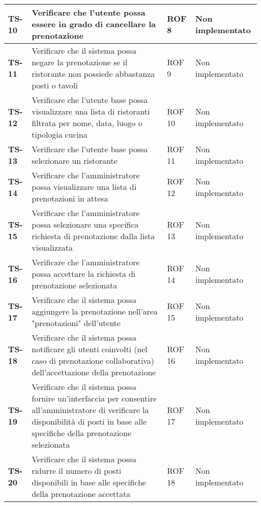 \begin{longtable}{|>{\centering\arraybackslash}p{1.5cm}|p{9.8cm}|p{2cm}|p{3.5cm}|}
    \hline
    \rowcolor{gray!10}
    \textbf{TS-10} & Verificare che l'utente possa essere in grado di cancellare la prenotazione & ROF 8 & Non implementato \\ 
    \hline
    \rowcolor{gray!10}
    \textbf{TS-11} & Verificare che il sistema possa negare la prenotazione se il ristorante non possiede abbastanza posti o tavoli & ROF 9 & Non implementato \\ 
    \hline
    \rowcolor{gray!10}
    \textbf{TS-12} & Verificare che l'utente base possa visualizzare una lista di ristoranti filtrata per nome, data, luogo o tipologia cucina & ROF 10 & Non implementato \\ 
    \hline
    \rowcolor{gray!10}
    \textbf{TS-13} & Verificare che l'utente base possa selezionare un ristorante & ROF 11 & Non implementato \\ 
    \hline
    \rowcolor{gray!10}
    \textbf{TS-14} & Verificare che l'amministratore possa visualizzare una lista di prenotazioni in attesa & ROF 12 & Non implementato \\
    \hline
    \rowcolor{gray!10}
    \textbf{TS-15} & Verificare che l'amministratore possa selezionare una specifica richiesta di prenotazione dalla lista visualizzata & ROF 13 & Non implementato \\ 
    \hline
    \rowcolor{gray!10}
    \textbf{TS-16} & Verificare che l'amministratore possa accettare la richiesta di prenotazione selezionata & ROF 14 & Non implementato \\ 
    \hline
    \rowcolor{gray!10}
    \textbf{TS-17} & Verificare che il sistema possa aggiungere la prenotazione nell'area "prenotazioni" dell'utente & ROF 15 & Non implementato \\
    \hline
    \rowcolor{gray!10}
    \textbf{TS-18} & Verificare che il sistema possa notificare gli utenti coinvolti (nel caso di prenotazione collaborativa) dell'accettazione della prenotazione & ROF 16 & Non implementato \\ 
    \hline
    \rowcolor{gray!10}
    \textbf{TS-19} & Verificare che il sistema possa fornire un'interfaccia per consentire all'amministratore di verificare la disponibilità di posti in base alle specifiche della prenotazione selezionata & ROF 17 & Non implementato \\ 
    \hline
    \rowcolor{gray!10}
    \textbf{TS-20} & Verificare che il sistema possa ridurre il numero di posti disponibili in base alle specifiche della prenotazione accettata & ROF 18 & Non implementato \\ 

\end{longtable}
